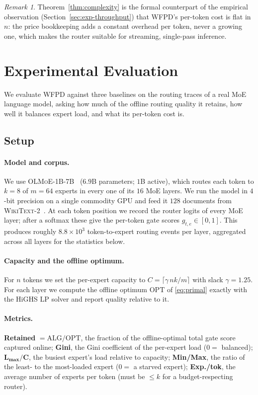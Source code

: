 \documentclass[preprint,12pt]{elsarticle}
\theoremstyle{plain}
\theoremstyle{remark}
\newtheorem{remark}{Remark}
\newcommand{\opt}{\mathrm{OPT}}
\newcommand{\alg}{\mathrm{ALG}}
\newcommand{\Lmax}{L_{\max}}
\begin{document}
\begin{remark}
Theorem~\ref{thm:complexity} is the formal counterpart of the empirical
observation (Section~\ref{sec:exp-throughput}) that WFPD's per-token cost is
flat in $n$: the price bookkeeping adds a constant overhead per token, never
a growing one, which makes the router suitable for streaming, single-pass
inference.
\end{remark}

\section{Experimental Evaluation}
\label{sec:exp}

We evaluate WFPD against three baselines on the routing traces of a real
MoE language model, asking how much of the offline routing quality it
retains, how well it balances expert load, and what its per-token cost is.

\subsection{Setup}
\label{sec:exp-setup}

\paragraph{Model and corpus.}
We use \textsc{OLMoE-1B-7B}~\cite{olmoe} ($6.9$B parameters; $1$B active),
which routes each token to $k=8$ of $m=64$ experts in every one of its $16$
MoE layers. We run the model in $4$-bit precision on a single commodity GPU
and feed it $128$ documents from \textsc{WikiText-2}~\cite{wikitext}. At
each token position we record the router logits of every MoE layer; after a
softmax these give the per-token gate scores $g_{t,e}\in[0,1]$. This
produces roughly $8.8\times10^{3}$ token-to-expert routing events per layer,
aggregated across all layers for the statistics below.

\paragraph{Capacity and the offline optimum.}
For $n$ tokens we set the per-expert capacity to $C=\lceil\gamma\,nk/m\rceil$
with slack $\gamma=1.25$. For each layer we compute the offline optimum
$\opt$ of \eqref{eq:primal} exactly with the HiGHS LP solver and report
quality relative to it.

\paragraph{Metrics.}
\textbf{Retained} $=\alg/\opt$, the fraction of the offline-optimal total
gate score captured online; \textbf{Gini}, the Gini coefficient of the
per-expert load ($0=$ balanced); $\boldsymbol{\Lmax/C}$, the busiest
expert's load relative to capacity; \textbf{Min/Max}, the ratio of the
least- to the most-loaded expert ($0=$ a starved expert); \textbf{Exp./tok}, the average number of experts per token (must be $\le k$
for a budget-respecting router).
\end{document}
